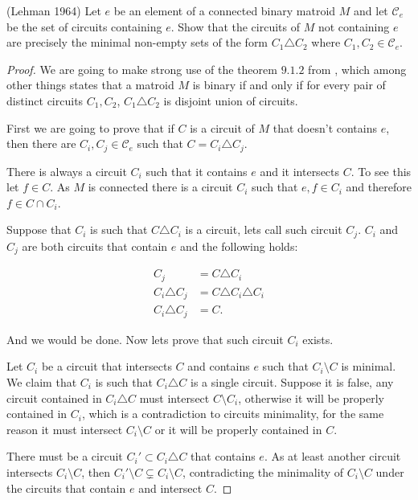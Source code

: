 \prob
{
    (Lehman 1964) Let $e$ be an element of a connected binary matroid $M$ and let $\mathcal{C}_e$ be the set of circuits
    containing $e$. Show that the circuits of $M$ not containing $e$ are precisely the minimal non-empty sets of the
    form $C_1 \triangle C_2$ where $C_1, C_2 \in \mathcal{C}_e$.
}
\begin{proof}

    We are going to make strong use of the theorem $9.1.2$ from \cite{Oxley}, which among other things states that
    a matroid $M$ is binary if and only if for every pair of distinct circuits $C_1, C_2$, $C_1 \triangle C_2$ is disjoint
    union of circuits.\pn
    
    First we are going to prove that if $C$ is a circuit of $M$ that doesn't contains $e$, then there are $C_i, C_j \in \mathcal{C}_e$ 
    such that $C = C_i \triangle C_j$.\pn
    
    There is always a circuit $C_i$ such that it contains $e$ and it intersects $C$. To see this
    let $f \in C$. As $M$ is connected there is a circuit $C_i$ such that $e, f \in C_i$ and therefore $f \in C \cap C_i$.\pn
    
    Suppose that $C_i$ is such that $C \triangle C_i$ is a circuit, lets call such circuit $C_j$. $C_i$ and $C_j$ are
    both circuits that contain $e$ and the following holds:\pn
    
    \begin{align}
            C_j &= C \triangle C_i   \\
            C_i \triangle C_j &= C \triangle C_i \triangle C_i       \\     
            C_i \triangle C_j &= C.            
    \end{align}
    
    And we would be done. Now lets prove that such circuit $C_i$ exists.\pn
    
    Let $C_i$ be a circuit that intersects $C$ and contains $e$ such that $C_i \setminus C$ is minimal. We claim that $C_i$ is such that
    $C_i \triangle C$ is a single circuit. Suppose it is false, any circuit contained in $C_i \triangle C$ must intersect $C \setminus C_i$, 
    otherwise it will be properly contained in $C_i$, which is a contradiction to circuits minimality, for the same reason it must intersect 
    $C_i \setminus C$ or it will be properly contained in $C$.\pn
    
    There must be a circuit $C_i' \subset C_i \triangle C$ that contains $e$. As at least another circuit intersects $C_i \setminus C$, then
    $C_i' \setminus C \varsubsetneq C_i \setminus C$, contradicting the minimality of $C_i \setminus C$ under the circuits that contain $e$ and
    intersect $C$.\pn
    

\end{proof}

